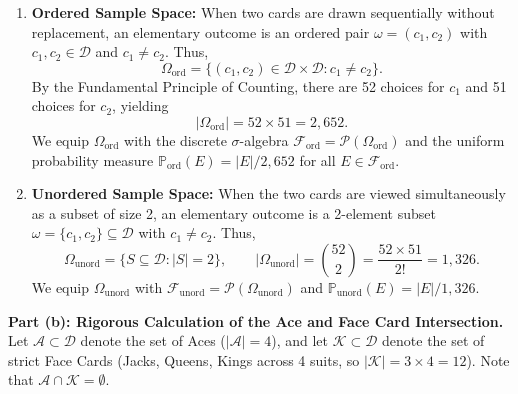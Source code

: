 \documentclass[11pt, letterpaper]{article}
\theoremstyle{definition}
\theoremstyle{remark}
\newcommand{\Prob}{\mathbb{P}}
\newcommand{\F}{\mathcal{F}}
\begin{document}
\begin{enumerate}[label=\arabic*.]
    \item \textbf{Ordered Sample Space:} When two cards are drawn sequentially without replacement, an elementary outcome is an ordered pair $\omega = (c_1, c_2)$ with $c_1, c_2 \in \mathcal{D}$ and $c_1 \neq c_2$. Thus,
    \[
    \Omega_{\text{ord}} = \{(c_1, c_2) \in \mathcal{D} \times \mathcal{D} : c_1 \neq c_2\}.
    \]
    By the Fundamental Principle of Counting, there are 52 choices for $c_1$ and 51 choices for $c_2$, yielding
    \[
    |\Omega_{\text{ord}}| = 52 \times 51 = 2{,}652.
    \]
    We equip $\Omega_{\text{ord}}$ with the discrete $\sigma$-algebra $\F_{\text{ord}} = \mathcal{P}(\Omega_{\text{ord}})$ and the uniform probability measure $\Prob_{\text{ord}}(E) = |E| / 2{,}652$ for all $E \in \F_{\text{ord}}$.

    \item \textbf{Unordered Sample Space:} When the two cards are viewed simultaneously as a subset of size 2, an elementary outcome is a 2-element subset $\omega = \{c_1, c_2\} \subseteq \mathcal{D}$ with $c_1 \neq c_2$. Thus,
    \[
    \Omega_{\text{unord}} = \{S \subseteq \mathcal{D} : |S| = 2\}, \qquad |\Omega_{\text{unord}}| = \binom{52}{2} = \frac{52 \times 51}{2!} = 1{,}326.
    \]
    We equip $\Omega_{\text{unord}}$ with $\F_{\text{unord}} = \mathcal{P}(\Omega_{\text{unord}})$ and $\Prob_{\text{unord}}(E) = |E| / 1{,}326$.
\end{enumerate}

\textbf{Part (b): Rigorous Calculation of the Ace and Face Card Intersection.}
Let $\mathcal{A} \subset \mathcal{D}$ denote the set of Aces ($|\mathcal{A}| = 4$), and let $\mathcal{K} \subset \mathcal{D}$ denote the set of strict Face Cards (Jacks, Queens, Kings across 4 suits, so $|\mathcal{K}| = 3 \times 4 = 12$). Note that $\mathcal{A} \cap \mathcal{K} = \emptyset$.
\end{document}
